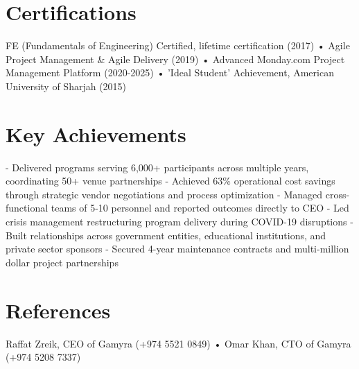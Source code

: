 \documentclass[a4paper,12pt]{article}
\begin{document}
\section{Certifications}
FE (Fundamentals of Engineering) Certified, lifetime certification (2017) • Agile Project Management \& Agile Delivery (2019) • Advanced Monday.com Project Management Platform (2020-2025) • 'Ideal Student' Achievement, American University of Sharjah (2015)

\section{Key Achievements}
- Delivered programs serving 6,000+ participants across multiple years, coordinating 50+ venue partnerships  
- Achieved 63\% operational cost savings through strategic vendor negotiations and process optimization  
- Managed cross-functional teams of 5-10 personnel and reported outcomes directly to CEO  
- Led crisis management restructuring program delivery during COVID-19 disruptions  
- Built relationships across government entities, educational institutions, and private sector sponsors  
- Secured 4-year maintenance contracts and multi-million dollar project partnerships  

\section{References}
Raffat Zreik, CEO of Gamyra (+974 5521 0849) • Omar Khan, CTO of Gamyra (+974 5208 7337)

\end{document}
